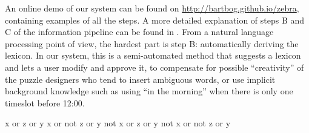 \noindent
An online demo of our system can be found on \url{http://bartbog.github.io/zebra}, containing examples of all the steps. 
A more detailed explanation of steps B and C of the information pipeline can be found in \cite{msc/Claes17}. From a natural language processing point of view, the hardest part is step B: automatically deriving the lexicon. In our system, this is a semi-automated method that suggests a lexicon and lets a user modify and approve it, to compensate for possible ``creativity'' of the puzzle designers who tend to insert ambiguous words, or use implicit background knowledge such as using ``in the morning'' when there is only one timeslot before 12:00.

x or z or y
x or not z or y
not x or  z or y
not x or not z or y
